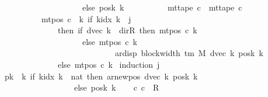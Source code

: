 \begin{isabellebody}
\ \ \ \ \ \ \ \ \ \ \ \ \ \ \ \ \ \ \ \ else\ posk{}\ k{\isacharparenright}{\kern0pt}{\isacharparenright}{\kern0pt}\isanewline
\ \ \ \ \ \ \ \ \ {\isasymand}\ mt{\isacharunderscore}{\kern0pt}tape\ c\ {\isacharequal}{\kern0pt}\ mt{\isacharunderscore}{\kern0pt}tape\ c{}\isanewline
\ \ \ \ \ \ \ \ \ {\isasymand}\ mt{\isacharunderscore}{\kern0pt}pos\ c\ {\isacharequal}{\kern0pt}\ {\isacharparenleft}{\kern0pt}{\isasymlambda}k{\isachardot}{\kern0pt}\ if\ k{\isacharunderscore}{\kern0pt}idx\ k\ {\isacharless}{\kern0pt}\ j\isanewline
\ \ \ \ \ \ \ \ \ \ \ \ \ \ then\ {\isacharparenleft}{\kern0pt}if\ dvec\ k\ {\isacharequal}{\kern0pt}\ dir{\isachardot}{\kern0pt}R\ then\ mt{\isacharunderscore}{\kern0pt}pos\ c{}\ k\isanewline
\ \ \ \ \ \ \ \ \ \ \ \ \ \ \ \ \ \ \ \ else\ mt{\isacharunderscore}{\kern0pt}pos\ c{}\ k\isanewline
\ \ \ \ \ \ \ \ \ \ \ \ \ \ \ \ \ \ \ \ \ \ \ \ \ \ \ {\isacharminus}{\kern0pt}\ ar{\isacharunderscore}{\kern0pt}disp\ {\isacharparenleft}{\kern0pt}block{\isacharunderscore}{\kern0pt}width\ {\isacharparenleft}{\kern0pt}{\isasymGamma}{\isacharunderscore}{\kern0pt}tm\ M{\isacharparenright}{\kern0pt}{\isacharparenright}{\kern0pt}\ {\isacharparenleft}{\kern0pt}dvec\ k{\isacharparenright}{\kern0pt}\ {\isacharparenleft}{\kern0pt}posk{}\ k{\isacharparenright}{\kern0pt}{\isacharparenright}{\kern0pt}\isanewline
\ \ \ \ \ \ \ \ \ \ \ \ \ \ else\ mt{\isacharunderscore}{\kern0pt}pos\ c{}\ k{\isacharparenright}{\kern0pt}{\isacharparenright}{\kern0pt}{\isachardoublequoteclose}\isanewline
%
\isadelimproof
%
\endisadelimproof
%
\isatagproof
{}\isamarkupfalse%
\ {\isacharparenleft}{\kern0pt}induction\ j{\isacharparenright}{\kern0pt}\isanewline
\ \ \isamarkupfalse%
\ {}\isanewline
\ \ \isamarkupfalse%
\ {\isacharquery}{\kern0pt}pk{}\ {\isacharequal}{\kern0pt}\ {\isachardoublequoteopen}{\isasymlambda}k{\isachardot}{\kern0pt}\ if\ k{\isacharunderscore}{\kern0pt}idx\ k\ {\isacharless}{\kern0pt}\ {\isacharparenleft}{\kern0pt}{}{\isacharcolon}{\kern0pt}{\isacharcolon}{\kern0pt}nat{\isacharparenright}{\kern0pt}\ then\ ar{\isacharunderscore}{\kern0pt}newpos\ {\isacharparenleft}{\kern0pt}dvec\ k{\isacharparenright}{\kern0pt}\ {\isacharparenleft}{\kern0pt}posk{}\ k{\isacharparenright}{\kern0pt}\isanewline
\ \ \ \ \ \ \ \ \ \ \ \ \ \ \ \ \ \ else\ posk{}\ k{\isachardoublequoteclose}\isanewline
\ \ \isamarkupfalse%
\ {\isachardoublequoteopen}{\isacharparenleft}{\kern0pt}c{}{\isacharcomma}{\kern0pt}\ c{}{\isacharparenright}{\kern0pt}\ {\isasymin}\ R{\isacharprime}{\kern0pt}\ {\isacharcircum}{\kern0pt}{\isacharcircum}{\kern0pt}\ {}{\isachardoublequoteclose}\ \isamarkupfalse%

\end{isabellebody}
